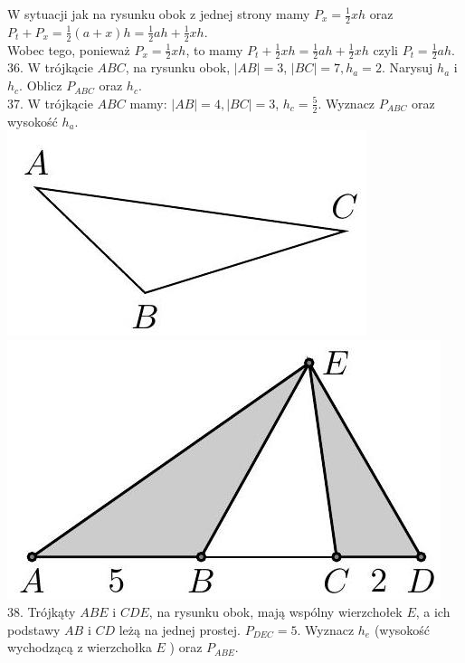 \documentclass[10pt]{article}
\begin{document}
W sytuacji jak na rysunku obok z jednej strony mamy \(P_{x}=\frac{1}{2} x h\) oraz\\
\(P_{t}+P_{x}=\frac{1}{2}(a+x) h=\frac{1}{2} a h+\frac{1}{2} x h\).\\
Wobec tego, ponieważ \(P_{x}=\frac{1}{2} x h\), to mamy \(P_{t}+\frac{1}{2} x h=\frac{1}{2} a h+\frac{1}{2} x h\) czyli \(P_{t}=\frac{1}{2} a h\).\\
36. W trójkącie \(A B C\), na rysunku obok, \(|A B|=3\), \(|B C|=7, h_{a}=2\). Narysuj \(h_{a}\) i \(h_{c}\). Oblicz \(P_{A B C}\) oraz \(h_{c}\).\\
37. W trójkącie \(A B C\) mamy: \(|A B|=4,|B C|=3\), \(h_{c}=\frac{5}{2}\). Wyznacz \(P_{A B C}\) oraz wysokość \(h_{a}\).\\
\includegraphics[max width=\textwidth, center]{2024_11_21_8f01584889ff06348ae7g-197(3)}\\
\includegraphics[max width=\textwidth, center]{2024_11_21_8f01584889ff06348ae7g-198}\\
38. Trójkąty \(A B E\) i \(C D E\), na rysunku obok, mają wspólny wierzchołek \(E\), a ich podstawy \(A B\) i \(C D\) leżą na jednej prostej. \(P_{D E C}=5\). Wyznacz \(h_{e}\) (wysokość wychodzącą z wierzchołka \(E\) ) oraz \(P_{A B E}\).\\
\end{document}
